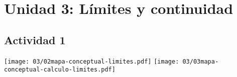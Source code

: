 \section*{Unidad 3: Límites y continuidad}

\subsection*{Actividad 1}
\begin{center}
	\texttt{[image: 03/02mapa-conceptual-limites.pdf]}
	\texttt{[image: 03/03mapa-conceptual-calculo-limites.pdf]}
\end{center}
